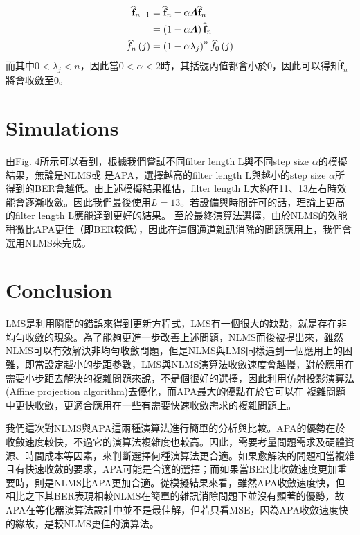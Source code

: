 \documentclass[conference]{IEEEtran}
\begin{document}
    \begin{align}\label{eq:32}
        \widehat{\textbf{f}}_{n+1}&=\widehat{\textbf{f}}_{n} -\alpha \boldsymbol{\Lambda}\widehat{\textbf{f}}_{n} \notag \\
        &=\left( 1-\alpha \boldsymbol{\Lambda} \right) \widehat{\textbf{f}}_{n} \notag \\
        \widehat{f}_n\left( j \right)&=\left( 1-\alpha \lambda_j \right)^n\widehat{f}_0\left( j \right)
    \end{align}
    而其中$0<\lambda_j<n$，因此當$0<\alpha<2$時，其括號內值都會小於$0$，因此可以得知$\widetilde{\textbf{f}}_n$將會收斂至$0$。
    
    \section{Simulations}\label{sec_sim}
    
    由Fig. 4所示可以看到，根據我們嘗試不同filter length L與不同step size $\alpha$的模擬結果，無論是NLMS或 是APA，選擇越高的filter length L與越小的step size $\alpha$所得到的BER會越低。由上述模擬結果推估，filter length L大約在11、13左右時效能會逐漸收斂。因此我們最後使用$L=13$。若設備與時間許可的話，理論上更高的filter length L應能達到更好的結果。
    至於最終演算法選擇，由於NLMS的效能稍微比APA更佳（即BER較低），因此在這個通道雜訊消除的問題應用上，我們會選用NLMS來完成。
    

    \section{Conclusion}\label{sec_con}
    LMS是利用瞬間的錯誤來得到更新方程式，LMS有一個很大的缺點，就是存在非均勻收斂的現象。為了能夠更進一步改善上述問題，NLMS而後被提出來，雖然NLMS可以有效解決非均勻收斂問題，但是NLMS與LMS同樣遇到一個應用上的困難，即當設定越小的步距參數，LMS與NLMS演算法收斂速度會越慢，對於應用在需要小步距去解決的複雜問題來說，不是個很好的選擇，因此利用仿射投影演算法(Affine projection algorithm)去優化，而APA最大的優點在於它可以在 複雜問題中更快收斂，更適合應用在一些有需要快速收斂需求的複雜問題上。
    
    我們這次對NLMS與APA這兩種演算法進行簡單的分析與比較。APA的優勢在於收斂速度較快，不過它的演算法複雜度也較高。因此，需要考量問題需求及硬體資源、時間成本等因素，來判斷選擇何種演算法更合適。如果愈解決的問題相當複雜且有快速收斂的要求，APA可能是合適的選擇；而如果當BER比收斂速度更加重要時，則是NLMS比APA更加合適。從模擬結果來看，雖然APA收斂速度快，但相比之下其BER表現相較NLMS在簡單的雜訊消除問題下並沒有顯著的優勢，故APA在等化器演算法設計中並不是最佳解，但若只看MSE，因為APA收斂速度快的緣故，是較NLMS更佳的演算法。
    
\end{document}
